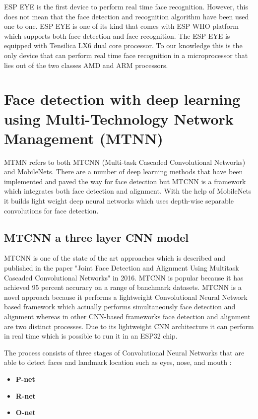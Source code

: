 ESP EYE is the first device to perform real time face recognition. However, this does not mean that the face detection and recognition algorithm have been used one to one. ESP EYE is one of its kind that comes with ESP WHO \cite{esp-who} platform which supports both face detection and face recognition. The ESP EYE \cite{espeye} is equipped with Tensilica LX6 dual core processor. To our knowledge this is the only device that can perform real time face recognition in a microprocessor that lies out of the two classes AMD and ARM processors. 

\section{Face detection with deep learning using Multi-Technology Network Management (MTNN)}

MTMN refers to both MTCNN (Multi-task Cascaded Convolutional Networks) and MobileNets. There are a number of deep learning methods that have been implemented and paved the way for face detection but MTCNN is a framework which integrates both face detection and alignment. With the help of MobileNets it builds light weight deep neural networks which uses depth-wise separable convolutions for face detection.


\subsection{MTCNN a three layer CNN model}

MTCNN is one of the state of the art approaches which is described and published in the paper "Joint Face Detection and Alignment Using Multitask Cascaded Convolutional Networks" \cite{refmtcnn} in 2016. MTCNN is popular because it has achieved 95 percent accuracy on a range of banchmark datasets. MTCNN is a novel approach because it performs a lightweight Convolutional Neural Network based framework which actually performs simultaneously face detection and alignment whereas in other CNN-based frameworks face detection and alignment are two distinct processes.   
Due to its lightweight CNN architecture it can perform in real time which is possible to run it in an ESP32 chip. 

The process consists of three stages of Convolutional Neural Networks that are able to detect faces and landmark location such as eyes, nose, and mouth : 

\begin{itemize}
    \item \textbf{P-net} 
    \item \textbf{R-net} 
    \item \textbf{O-net} 
\end{itemize}


